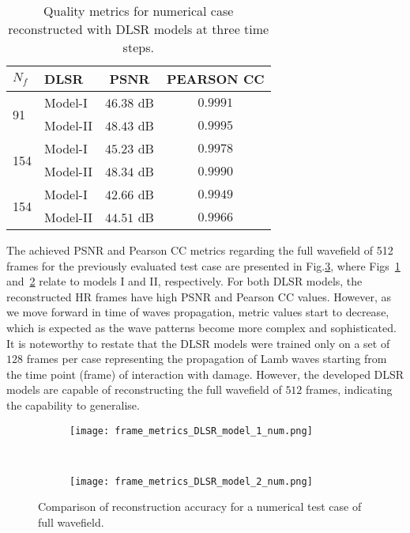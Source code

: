 \begin{table}[!ht]
	\renewcommand{\arraystretch}{1.3}
	\centering \footnotesize
	\caption{Quality metrics for numerical case reconstructed with DLSR models at three time steps.}	
	\begin{tabular}{llcc} 
		\toprule		
		$N_f$ & DLSR & PSNR & PEARSON CC\\
		\midrule
		\multirow{2}{*}{91} & Model-I  & \(46.38\) dB & \(0.9991\) \\
		 				   & Model-II & \(48.43\) dB & \(0.9995\) \\
		\midrule
		\multirow{2}{*}{154} & Model-I  & \(45.23\) dB & \(0.9978\) \\
							& Model-II & \(48.34\) dB & \(0.9990\) \\
		\midrule
		\multirow{2}{*}{154} & Model-I  & \(42.66\) dB & \(0.9949\) \\
							& Model-II & \(44.51\) dB & \(0.9966\) \\
		\bottomrule
	\end{tabular}	
	\label{tab:num_results}
\end{table}

The achieved PSNR and Pearson CC metrics regarding the full wavefield of 512 frames for the previously evaluated test case are presented in Fig.\ref{fig:num_case_475_metrics}, where Figs~\ref{fig:num_model_I} and~\ref{fig:num_model_II} relate to models I and II, respectively.
For both DLSR models, the reconstructed HR frames have high PSNR and Pearson CC values.
However, as we move forward in time of waves propagation, metric values start to decrease, which is expected as the wave patterns become more complex and sophisticated.
It is noteworthy to restate that the DLSR models were trained only on a set of $128$ frames per case representing the propagation of Lamb waves starting from the time point (frame) of interaction with damage. 
However, the developed DLSR models are capable of reconstructing the full wavefield of $512$ frames, indicating the capability to generalise.
\begin{figure} [!ht]
	\centering
	\begin{subfigure}[b]{1\textwidth}
		\centering
		\texttt{[image: frame\_metrics\_DLSR\_model\_1\_num.png]}
		\caption{}
		\label{fig:num_model_I}
	\end{subfigure} \\
	\begin{subfigure}[b]{1\textwidth}
		\centering
		\texttt{[image: frame\_metrics\_DLSR\_model\_2\_num.png]}
		\caption{}
		\label{fig:num_model_II}
	\end{subfigure}
	\caption{Comparison of reconstruction accuracy for a numerical test case of full wavefield.}
	\label{fig:num_case_475_metrics}
\end{figure}
\clearpage

